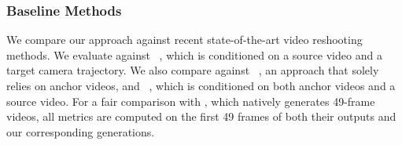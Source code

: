 


 








\subsubsection{Baseline Methods}
\label{sec:baselines}

We compare our approach against recent state-of-the-art video reshooting methods. We evaluate against \recammaster{}~\cite{bai2025recammaster}, which is conditioned on a source video and a target camera trajectory. We also compare against \exfd{}~\cite{ex4d}, an approach that solely relies on anchor videos, and \trajectorycrafter{}~\cite{yu2025trajectorycrafter}, which is conditioned on both anchor videos and a source video. For a fair comparison with \trajectorycrafter{}, which natively generates 49-frame videos, all metrics are computed on the first 49 frames of both their outputs and our corresponding generations.

